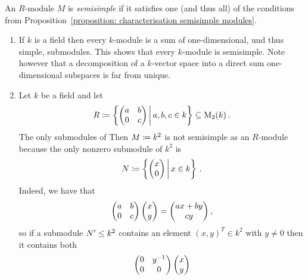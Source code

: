 \begin{definition}
  An $R$-module $M$ is \emph{semisimple} if it satisfies one (and thus all) of the conditions from Proposition~\ref{proposition: characterisation semisimple modules}.
\end{definition}


\begin{example}
  \label{example: semisimple modules}
  \leavevmode
  \begin{enumerate}
    \item
      \label{enumerate: vector spaces are semisimple}
      If $k$ is a field then every $k$-module is a sum of one-dimensional, und thus simple, submodules.
      This shows that every $k$-module is semisimple.
      Note however that a decomposition of a $k$-vector space into a direct sum one-dimensional subspaces is far from unique.
    \item
      Let $k$ be a field and let
      \[
                  R
        \defined  \left\{
                    \begin{pmatrix}
                      a & b \\
                      0 & c
                    \end{pmatrix}
                    \suchthat*
                    a, b, c \in k
                  \right\}
        \subseteq \Mat_2(k) \,.
      \]
      The only submodules of 
      Then $M \coloneqq k^2$ is not semisimple as an $R$-module because the only nonzero submodule of $k^2$ is
      \[
                  N
        \defined  \left\{
                    \vect{x \\ 0}
                  \suchthat*
                    x \in k
                  \right\} \,.
      \]
      Indeed, we have that
      \[
          \begin{pmatrix}
            a & b \\
            0 & c
          \end{pmatrix}
          \begin{pmatrix}x \\ y\end{pmatrix}
        = \begin{pmatrix}ax + by \\ cy\end{pmatrix},
      \]
      so if a submodule $N' \leq k^2$ contains an element $(x,y)^T \in k^2$ with $y \neq 0$ then it contains both
      \begin{align*}
            \begin{pmatrix}
              0 & y^{-1} \\
              0 & 0
            \end{pmatrix}
            \vect{x \\ y}

\end{align*}
\end{enumerate}
\end{example}
